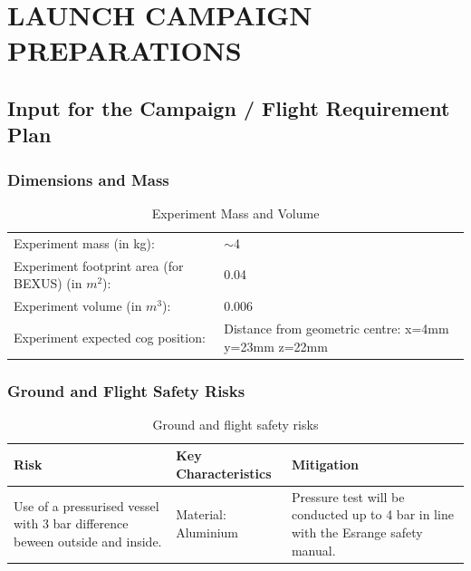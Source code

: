 \documentclass[
  a4paper,
  11pt,
  openany,
  parskip,
  toc=totoc,
  listof=totoc,
  bibliography=totoc
]{scrreprt}
\begin{document}
\chapter{LAUNCH CAMPAIGN PREPARATIONS}
\label{sec:campaign_preparations}
\section{Input for the Campaign / Flight Requirement Plan}
\label{sec:input_FRP}

\subsection{Dimensions and Mass}

\begin{table}[htbp]
\centering
\caption{Experiment Mass and Volume}
\label{tab:mass_volume}
\begin{tabular}{L{6cm}L{6cm}}
\toprule
Experiment mass (in kg): & $\sim$4\\
Experiment footprint area (for BEXUS) (in $m^2$): & 0.04\\
Experiment volume (in $m^3$): & 0.006\\
Experiment expected \gls{cog} position: & Distance from geometric centre: x=4mm y=23mm z=22mm \\
\bottomrule
\end{tabular}
\end{table}
\clearpage 

\subsection{Ground and Flight Safety Risks}

\begin{table}[htbp]
\centering
\caption{Ground and flight safety risks}
\label{tab:safety_risks}
\begin{tabular}{p{4cm} p{5cm} p{4cm}}
\toprule
\textbf{Risk} & \textbf{Key Characteristics} & \textbf{Mitigation} \\
\midrule
Use of a pressurised vessel with 3 bar difference beween outside and inside. & Material: Aluminium & Pressure test will be conducted up to 4 bar in line with the Esrange safety manual. \\
\bottomrule
\end{tabular}
\end{table}
\clearpage
\end{document}
